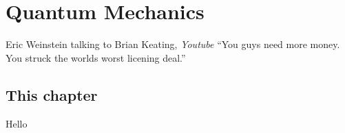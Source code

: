 \documentclass[../rzero]{subfiles}
\begin{document}
\chapter{Quantum Mechanics}\label{quantumMechanicsChapter}

\begin{chapquote}{Eric Weinstein talking to Brian Keating, \textit{Youtube\cite{drbriankeatingEricWeinsteinTheoretical2020}}}
``You guys need more money. You struck the worlds worst licening deal.''
\end{chapquote}


\section{This chapter}
Hello
\end{document}
